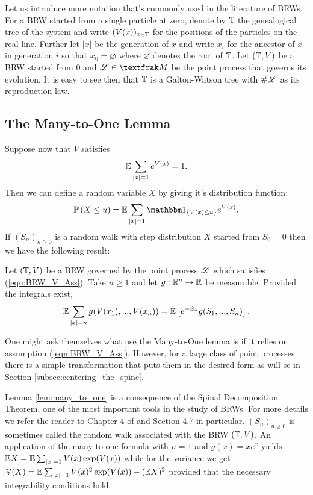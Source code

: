 Let us introduce more notation that's commonly used in the literature of BRWs. For a BRW started from a single particle at zero, denote by $\mathbb{T}$ the genealogical tree of the system and write $(V(x))_{x \in \mathbb{T}}$ for the positions of the particles on the real line. Further let $|x|$ be the generation of $x$ and write $x_i$ for the ancestor of $x$ in generation $i$ so that $x_0 = \varnothing$ where $\varnothing$ denotes the root of $\mathbb{T}$. Let $(\mathbb{T}, V)$ be a BRW started from $0$ and $\scr{L} \in \frak{M}$ be the point process that governs its evolution. It is easy to see then that $\mathbb{T}$ is a Galton-Watson tree with $\# \mathscr{L}$ as its reproduction law. 

\subsection{The Many-to-One Lemma}

Suppose now that $V$ satisfies
\begin{equation}\label{eqn:BRW_V_Ass}
\mathbb{E} \sum\limits_{|x|=1} e^{V(x)} = 1. 
\end{equation}
Then we can define a random variable $X$ by giving it's distribution function: 
\begin{equation}\nonumber
\Pr{X \leq u} = \E \sum\limits_{|x| = 1} \Ind_{\{V(x) \leq u\}} e^{V(x)}. 
\end{equation}
If $(S_n)_{n\geq0}$ is a random walk with step distribution $X$ started from $S_0 = 0$ then we have the following result:
\begin{lemma}\label{lem:many_to_one}
Let $(\mathbb{T}, V)$ be a BRW governed by the point process $\mathscr{L}$ which satisfies (\ref{eqn:BRW_V_Ass}). Take $n \geq 1$ and let $g:\mathbb{R}^n \to \mathbb{R}$ be measurable. Provided the integrals exist, 
\begin{equation}\nonumber
\mathbb{E} \sum\limits_{|x| = n} g(V(x_1), ...,V(x_n)) = \mathbb{E}\left[ e^{-S_n} g(S_1, ...,S_n) \right]. 
\end{equation}
\end{lemma}
\begin{remark}
One might ask themselves what use the Many-to-One lemma is if it relies on assumption (\ref{eqn:BRW_V_Ass}). However, for a large class of point processes there is a simple transformation that puts them in the desired form as will se in Section \ref{subsec:centering_the_spine}. 
\end{remark}

Lemma \ref{lem:many_to_one} is a consequence of the Spinal Decomposition Theorem, one of the most important tools in the study of BRWs. For more details we refer the reader to Chapter 4 of \cite{shi2015branching} and Section 4.7 in particular. $(S_n)_{n\geq0}$ is sometimes called the random walk associated with the BRW $(\mathbb{T}, V)$. An application of the many-to-one formula with $n=1$ and $g(x) = x e^x$ yields $\mathbb{E} X = \mathbb{E} \sum_{|x|=1} V(x) \exp(V(x))$ while for the variance we get $\mathbb{V}(X) = \mathbb{E} \sum_{|x|=1} V(x)^2 \exp(V(x)) - (\mathbb{E} X)^2$ provided that the necessary integrability conditions hold. \\





